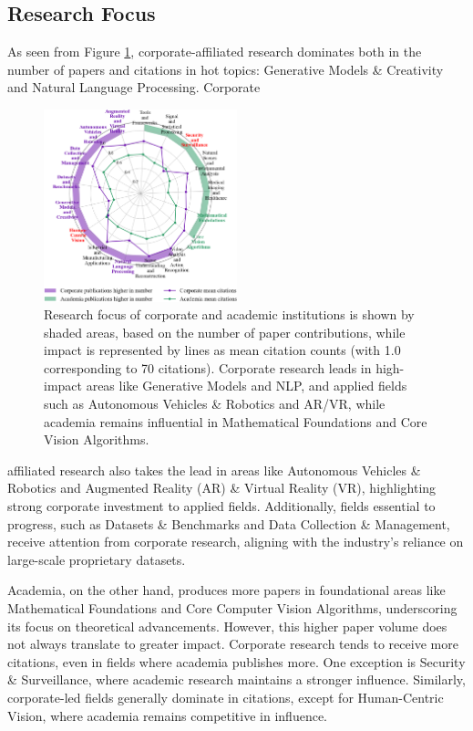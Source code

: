 \documentclass{article}
\begin{document}
\subsection{Research Focus}
\vspace{-7pt}
As seen from Figure \ref{fig:research_focus_radar}, corporate-affiliated research dominates both in the number of papers and citations in hot topics: Generative Models \& Creativity and Natural Language Processing. Corporate
\begin{figure}
\centering
\vspace{-10pt}
\includegraphics[width=0.5\textwidth]{report/images/citation_radar_plot.png}  
\caption{Research focus of corporate and academic institutions is shown by shaded areas, based on the number of paper contributions, while impact is represented by lines as mean citation counts (with 1.0 corresponding to 70 citations). Corporate research leads in high-impact areas like Generative Models and NLP, and applied fields such as Autonomous Vehicles \& Robotics and AR/VR, while academia remains influential in Mathematical Foundations and Core Vision Algorithms.}
\vspace{10pt}
\label{fig:research_focus_radar}
\end{figure}
affiliated research also takes the lead in areas like Autonomous Vehicles \& Robotics and Augmented Reality (AR) \& Virtual Reality (VR), highlighting strong corporate investment to applied fields. Additionally, fields essential to progress, such as Datasets \& Benchmarks and Data Collection \& Management, receive attention from corporate research, aligning with the industry's reliance on large-scale proprietary datasets.

Academia, on the other hand, produces more papers in foundational areas like Mathematical Foundations and Core Computer Vision Algorithms, underscoring its focus on theoretical advancements. However, this higher paper volume does not always translate to greater impact. Corporate research tends to receive more citations, even in fields where academia publishes more. One exception is Security \& Surveillance, where academic research maintains a stronger influence. Similarly, corporate-led fields generally dominate in citations, except for Human-Centric Vision, where academia remains competitive in influence. 
\end{document}
